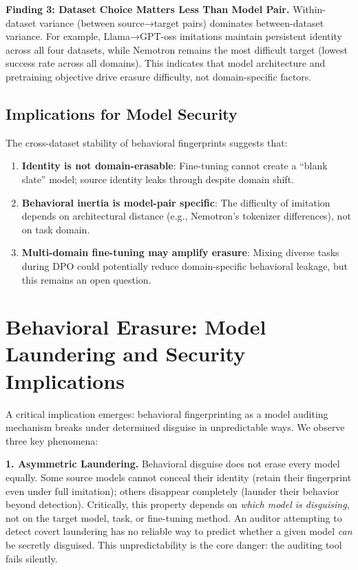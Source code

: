 \documentclass{article}
\begin{document}
\textbf{Finding 3: Dataset Choice Matters Less Than Model Pair.}
Within-dataset variance (between source→target pairs) dominates between-dataset variance. For example, Llama→GPT-oss imitations maintain persistent identity across all four datasets, while Nemotron remains the most difficult target (lowest success rate across all domains). This indicates that model architecture and pretraining objective drive erasure difficulty, not domain-specific factors.

\subsection*{Implications for Model Security}

The cross-dataset stability of behavioral fingerprints suggests that:
\begin{enumerate}
\item \textbf{Identity is not domain-erasable}: Fine-tuning cannot create a ``blank slate'' model; source identity leaks through despite domain shift.
\item \textbf{Behavioral inertia is model-pair specific}: The difficulty of imitation depends on architectural distance (e.g., Nemotron's tokenizer differences), not on task domain.
\item \textbf{Multi-domain fine-tuning may amplify erasure}: Mixing diverse tasks during DPO could potentially reduce domain-specific behavioral leakage, but this remains an open question.
\end{enumerate}

\section{Behavioral Erasure: Model Laundering and Security Implications}
\label{sec:phase_f}

A critical implication emerges: behavioral fingerprinting as a model auditing mechanism breaks under determined disguise in unpredictable ways. We observe three key phenomena:

\textbf{1. Asymmetric Laundering.} Behavioral disguise does not erase every model equally. Some source models cannot conceal their identity (retain their fingerprint even under full imitation); others disappear completely (launder their behavior beyond detection). Critically, this property depends on \textit{which model is disguising}, not on the target model, task, or fine-tuning method. An auditor attempting to detect covert laundering has no reliable way to predict whether a given model \textit{can} be secretly disguised. This unpredictability is the core danger: the auditing tool fails silently.
\end{document}
